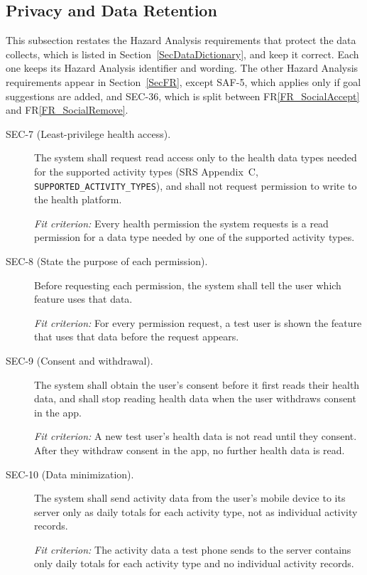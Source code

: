 \documentclass[12pt]{article}
\newcommand{\rref}[1]{FR\ref{#1}}
\begin{document}
\subsection{Privacy and Data Retention}
\label{SecPrivacyRetention}

This subsection restates the Hazard Analysis requirements that protect the
data \progname{} collects, which is listed in Section~\ref{SecDataDictionary},
and keep it correct. Each one keeps its Hazard Analysis identifier and
wording. The other Hazard Analysis requirements appear in Section~\ref{SecFR},
except SAF-5, which applies only if goal suggestions are added, and SEC-36,
which is split between \rref{FR_SocialAccept} and \rref{FR_SocialRemove}.

\begin{description}

\item[SEC-7 (Least-privilege health access).] The system shall request read access only to the health data types needed for
the supported activity types (SRS Appendix~C,
\texttt{SUPPORTED\_ACTIVITY\_TYPES}), and shall not request permission to
write to the health platform.

\textit{Fit criterion:} Every health permission the system requests is a read
permission for a data type needed by one of the supported activity types.

\item[SEC-8 (State the purpose of each permission).] Before requesting each permission, the system shall tell the user which
feature uses that data.

\textit{Fit criterion:} For every permission request, a test user is shown the
feature that uses that data before the request appears.

\item[SEC-9 (Consent and withdrawal).] The system shall obtain the user's consent before it first reads their health
data, and shall stop reading health data when the user withdraws consent in
the app.

\textit{Fit criterion:} A new test user's health data is not read until they
consent. After they withdraw consent in the app, no further health data is
read.

\item[SEC-10 (Data minimization).] The system shall send activity data from the user's mobile device to its
server only as daily totals for each activity type, not as individual activity
records.

\textit{Fit criterion:} The activity data a test phone sends to the server
contains only daily totals for each activity type and no individual activity
records.


\end{description}
\end{document}
